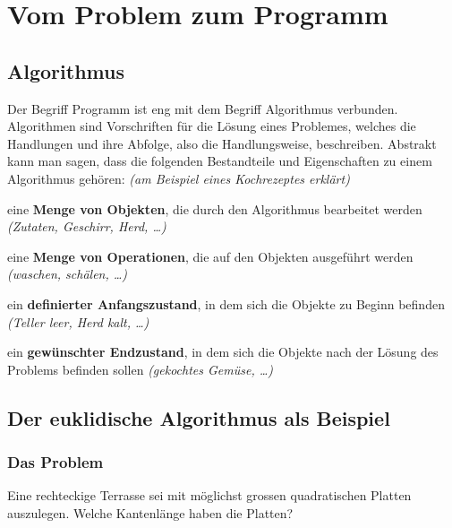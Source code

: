 \section{Vom Problem zum Programm }
	\subsection{Algorithmus}
		Der Begriff Programm ist eng mit dem Begriff Algorithmus verbunden. Algorithmen sind Vorschriften für die Lösung eines Problemes, welches die Handlungen und ihre Abfolge, also die Handlungsweise, beschreiben. Abstrakt kann man sagen, dass die folgenden Bestandteile und Eigenschaften zu einem Algorithmus gehören: \textit{(am Beispiel eines Kochrezeptes erklärt)} 
		\begin{compactitem}
			\item eine \textbf{Menge von Objekten}, die durch den Algorithmus bearbeitet werden \textit{(Zutaten, Geschirr, Herd, \dots)}
			\item eine \textbf{Menge von Operationen}, die auf den Objekten ausgeführt werden \textit{(waschen, schälen, \dots)}
			\item ein \textbf{definierter Anfangszustand}, in dem sich die Objekte zu Beginn befinden \textit{(Teller leer, Herd kalt, \dots)}
			\item ein \textbf{gewünschter Endzustand}, in dem sich die Objekte nach der Lösung des Problems befinden sollen \textit{(gekochtes Gemüse, \dots)}
		\end{compactitem}	

	\subsection{Der euklidische Algorithmus als Beispiel}
		\subsubsection{Das Problem}
				Eine rechteckige Terrasse sei mit möglichst grossen quadratischen Platten auszulegen. Welche Kantenlänge haben die Platten?
			
